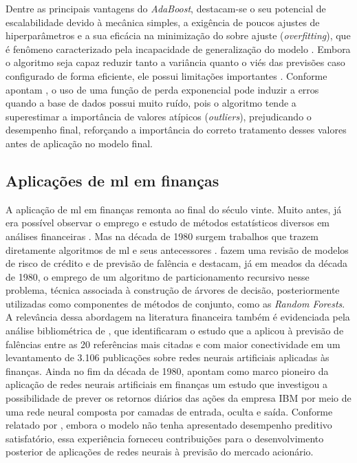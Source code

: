 Dentre as principais vantagens do \textit{AdaBoost}, destacam-se o seu potencial de escalabilidade devido à mecânica simples, a exigência de poucos ajustes de hiperparâmetros e a sua eficácia na minimização do sobre ajuste (\textit{overfitting}), que é fenômeno caracterizado pela incapacidade de generalização do modelo \cite{park2023intelligent}. Embora o algoritmo seja capaz reduzir tanto a variância quanto o viés das previsões caso configurado de forma eficiente, ele possui limitações importantes \cite{derbentsev2021comparative}. Conforme apontam , o uso de uma função de perda exponencial pode induzir a erros quando a base de dados possui muito ruído, pois o algoritmo tende a superestimar a importância de valores atípicos (\textit{outliers}), prejudicando o desempenho final, reforçando a importância do correto tratamento desses valores antes de aplicação no modelo final.

\subsection{Aplicações de \acl{ml} em finanças}
\label{subsec_aplicacoes_de_machine_learning_em_financas}

A aplicação de \acs{ml} em finanças remonta ao final do século vinte. Muito antes, já era possível observar o emprego e estudo de métodos estatísticos diversos em análises financeiras \cite{aranha2023efficacies}. Mas na década de 1980 surgem trabalhos que trazem diretamente algoritmos de \acs{ml} e seus antecessores \cite{aranha2023efficacies,balasubramanian2024survey,manogna2024bibliometric,kumar2025decennaries}.  fazem uma revisão de modelos de risco de crédito e de previsão de falência e destacam, já em meados da década de 1980, o emprego de um algoritmo de particionamento recursivo nesse problema, técnica associada à construção de árvores de decisão, posteriormente utilizadas como componentes de métodos de conjunto, como as \textit{Random Forests}. A relevância dessa abordagem na literatura financeira também é evidenciada pela análise bibliométrica de , que identificaram o estudo que a aplicou à previsão de falências entre as 20 referências mais citadas e com maior conectividade em um levantamento de 3.106 publicações sobre redes neurais artificiais aplicadas às finanças. Ainda no fim da década de 1980,  apontam como marco pioneiro da aplicação de redes neurais artificiais em finanças um estudo que investigou a possibilidade de prever os retornos diários das ações da empresa IBM por meio de uma rede neural composta por camadas de entrada, oculta e saída. Conforme relatado por , embora o modelo não tenha apresentado desempenho preditivo satisfatório, essa experiência forneceu contribuições para o desenvolvimento posterior de aplicações de redes neurais à previsão do mercado acionário.

